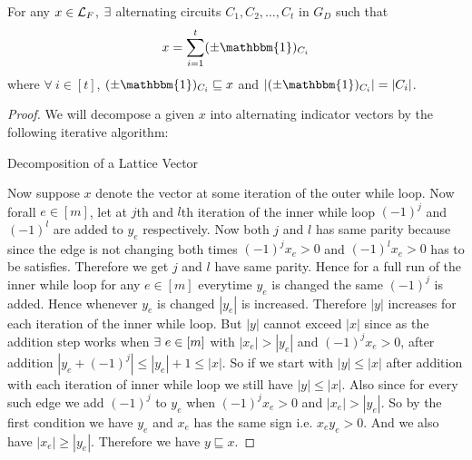 

\begin{lemma}{\cite[Claim 1, Proof of Theorem 3.4]{gurjarfrac}}{}
For any $x\in\mathcal{L}_F$, $\exists$ alternating circuits $C_1,C_2,\dots, C_t$ in $G_D$ such that $$x=\sum_{i=1}^t(\pm \mathbbm{1})_{C_i}$$where $\forall\ i\in[t]$, $(\pm \mathbbm{1})_{C_i}\sqsubseteq x$ and $|(\pm\mathbbm{1})_{C_i}|=|C_i|$.
\end{lemma}
\begin{proof}
	We will decompose a given $x$ into alternating indicator vectors by the following iterative algorithm:
	
	
	\begin{algorithm}[H]
		\DontPrintSemicolon
		\caption{Decomposition of a Lattice Vector}	
	\end{algorithm}
Now suppose $x$ denote the vector at some iteration of the outer while loop. Now forall $e\in[m]$, let at $j$th and $l$th iteration of the inner while loop $(-1)^j$ and $(-1)^l$ are added to $y_e$ respectively. Now both $j$ and $l$ has same parity because since the edge is not changing both times $(-1)^jx_e>0$ and $(-1)^lx_e>0$ has to be satisfies. Therefore we get $j$ and $l$ have same parity. Hence for a full run of the inner while loop for any $e\in[m]$ everytime $y_e$ is changed the same $(-1)^j$ is added. Hence whenever $y_e$ is changed $|y_e|$ is increased. Therefore $|y|$ increases for each iteration of the inner while loop. But $|y|$ cannot exceed $|x|$ since as the addition step works when $\exs \ e\in[m]$ with $|x_e|>|y_e|$ and $(-1)^jx_e>0$, after addition $|y_e+(-1)^j|\leq |y_e|+1\leq |x|$. So if we start with $|y|\leq |x|$ after addition with each iteration of inner while loop we still have $|y|\leq |x|$.  Also since for every such edge we add $(-1)^j$ to $y_e$ when $(-1)^jx_e>0$ and $|x_e|>|y_e|$. So by the first condition we have $y_e$ and $x_e$ has the same sign i.e. $x_ey_e>0$. And we also have $|x_e|\geq |y_e|$. Therefore we have $y\sqsubseteq x$.


\end{proof}

